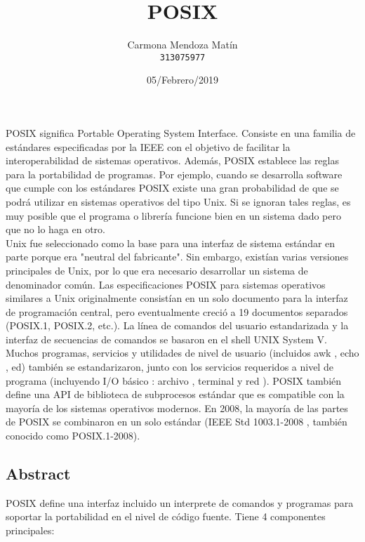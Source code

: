 \documentclass[11pt, a4paper]{report}
\begin{document}
\title{POSIX}
\author{
  Carmona Mendoza Mat\'in\\
  \texttt{313075977}
}
\date{05/Febrero/2019}
\maketitle

POSIX significa Portable Operating System Interface. Consiste en una 
familia de est\'andares especificadas por la IEEE con el objetivo de facilitar la 
interoperabilidad de sistemas operativos. Adem\'as, POSIX establece las reglas para la 
portabilidad de programas. Por ejemplo, cuando se desarrolla software que cumple con 
los est\'andares POSIX existe una gran probabilidad de que se podr\'a utilizar en sistemas 
operativos del tipo Unix. Si se ignoran tales reglas, es muy posible que el programa o 
librer\'ia funcione bien en un sistema dado pero que no lo haga en otro.\\

Unix fue seleccionado como la base para una interfaz de sistema est\'andar en parte porque 
era "neutral del fabricante". Sin embargo, exist\'ian varias versiones principales de Unix, 
por lo que era necesario desarrollar un sistema de denominador com\'un. Las especificaciones 
POSIX para sistemas operativos similares a Unix originalmente consist\'ian en un solo documento 
para la interfaz de programaci\'on central, pero eventualmente creci\'o a 19 documentos separados 
(POSIX.1, POSIX.2, etc.). La l\'inea de comandos del usuario estandarizada y la interfaz de 
secuencias de comandos se basaron en el shell UNIX System V. Muchos programas, servicios y 
utilidades de nivel de usuario (incluidos awk , echo , ed) también se estandarizaron, junto con 
los servicios requeridos a nivel de programa (incluyendo I/O b\'asico : archivo , terminal y red ). 
POSIX tambi\'en define una API de biblioteca de subprocesos est\'andar que es compatible con la 
mayor\'ia de los sistemas operativos modernos. En 2008, la mayor\'ia de las partes de POSIX se 
combinaron en un solo est\'andar (IEEE Std 1003.1-2008 , también conocido como POSIX.1-2008).\\

\subsection*{Abstract}
POSIX define una interfaz incluido un interprete de comandos y programas para soportar la portabilidad 
en el nivel de c\'odigo fuente. Tiene 4 componentes principales: \\
\end{document}
